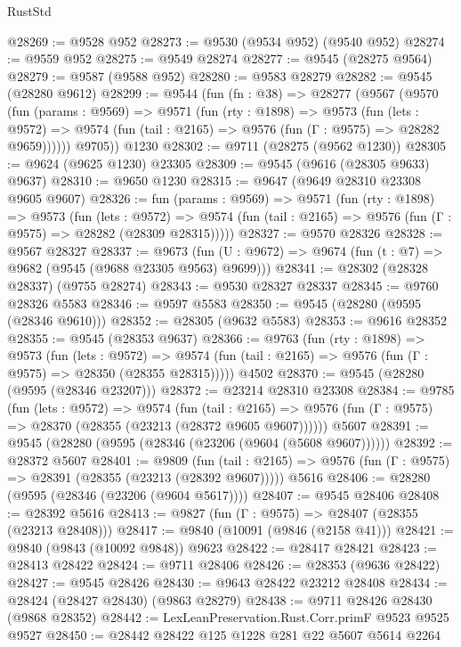 \begin{lexlean}{RustStd}
\begin{coremodule}
@28269 := @9528 @952
@28273 := @9530 (@9534 @952) (@9540 @952)
@28274 := @9559 @952
@28275 := @9549 @28274
@28277 := @9545 (@28275 @9564)
@28279 := @9587 (@9588 @952)
@28280 := @9583 @28279
@28282 := @9545 (@28280 @9612)
@28299 := @9544
    (fun (fn : @38) =>
    @28277
      (@9567
        (@9570
          (fun (params : @9569) =>
          @9571
            (fun (rty : @1898) =>
            @9573
              (fun (lets : @9572) =>
              @9574 (fun (tail : @2165) => @9576 (fun (Γ : @9575) => @28282 @9659))))))
        @9705))
    @1230
@28302 := @9711 (@28275 (@9562 @1230))
@28305 := @9624 (@9625 @1230) @23305
@28309 := @9545 (@9616 (@28305 @9633) @9637)
@28310 := @9650 @1230
@28315 := @9647 (@9649 @28310 @23308 @9605 @9607)
@28326 := fun (params : @9569) =>
  @9571
    (fun (rty : @1898) =>
    @9573
      (fun (lets : @9572) =>
      @9574 (fun (tail : @2165) => @9576 (fun (Γ : @9575) => @28282 (@28309 @28315)))))
@28327 := @9570 @28326
@28328 := @9567 @28327
@28337 := @9673
    (fun (U : @9672) => @9674 (fun (t : @7) => @9682 (@9545 (@9688 @23305 @9563) @9699)))
@28341 := @28302 (@28328 @28337) (@9755 @28274)
@28343 := @9530 @28327 @28337
@28345 := @9760 @28326 @5583
@28346 := @9597 @5583
@28350 := @9545 (@28280 (@9595 (@28346 @9610)))
@28352 := @28305 (@9632 @5583)
@28353 := @9616 @28352
@28355 := @9545 (@28353 @9637)
@28366 := @9763
    (fun (rty : @1898) =>
    @9573
      (fun (lets : @9572) =>
      @9574 (fun (tail : @2165) => @9576 (fun (Γ : @9575) => @28350 (@28355 @28315)))))
    @4502
@28370 := @9545 (@28280 (@9595 (@28346 @23207)))
@28372 := @23214 @28310 @23308
@28384 := @9785
    (fun (lets : @9572) =>
    @9574
      (fun (tail : @2165) =>
      @9576 (fun (Γ : @9575) => @28370 (@28355 (@23213 (@28372 @9605 @9607))))))
    @5607
@28391 := @9545 (@28280 (@9595 (@28346 (@23206 (@9604 (@5608 @9607))))))
@28392 := @28372 @5607
@28401 := @9809
    (fun (tail : @2165) => @9576 (fun (Γ : @9575) => @28391 (@28355 (@23213 (@28392 @9607)))))
    @5616
@28406 := @28280 (@9595 (@28346 (@23206 (@9604 @5617))))
@28407 := @9545 @28406
@28408 := @28392 @5616
@28413 := @9827 (fun (Γ : @9575) => @28407 (@28355 (@23213 @28408)))
@28417 := @9840 (@10091 (@9846 (@2158 @41)))
@28421 := @9840 (@9843 (@10092 @9848)) @9623
@28422 := @28417 @28421
@28423 := @28413 @28422
@28424 := @9711 @28406
@28426 := @28353 (@9636 @28422)
@28427 := @9545 @28426
@28430 := @9643 @28422 @23212 @28408
@28434 := @28424 (@28427 @28430) (@9863 @28279)
@28438 := @9711 @28426 @28430 (@9868 @28352)
@28442 := LexLeanPreservation.Rust.Corr.primF @9523 @9525 @9527
@28450 := @28442 @28422 @125 @1228 @281 @22 @5607 @5614 @2264

\end{coremodule}
\end{lexlean}
